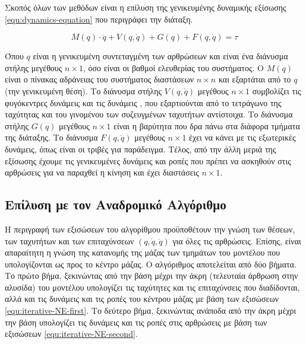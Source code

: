 Σκοπός όλων των μεθόδων είναι η επίλυση της γενικευμένης δυναμικής εξίσωσης \ref{equ:dynamics-equation} που περιγράφει την διάταξη.

\begin{equation}
    M(q) \cdot \ddot{q} + V(q, \dot{q}) + G(q) + F(q, \dot{q}) = \tau
    \label{equ:dynamics-equation}
\end{equation}

Όπου $q$ είναι η γενικευμένη συντεταγμένη των αρθρώσεων και είναι ένα διάνυσμα στήλης μεγέθους $n \times 1$, όσο είναι οι βαθμοί ελευθερίας του συστήματος. Ο $M(q)$ είναι ο πίνακας αδράνειας του συστήματος διαστάσεων $n \times n$ και εξαρτάται από το $q$ (την γενικευμένη θέση). Το διάνυσμα στήλης $V(q, \dot{q})$ μεγέθους $n \times 1$ συμβολίζει τις φυγόκεντρες δυνάμεις και τις δυνάμεις , που εξαρτιούνται από το τετράγωνο της ταχύτητας και του γινομένου των συζευγμένων ταχυτήτων αντίστοιχα. Το διάνυσμα στήλης $G(q)$ μεγέθους $n \times 1$ είναι η βαρύτητα που δρα πάνω στα διάφορα τμήματα της διάταξης. Το διάνυσμα $F(q, \dot{q})$ μεγέθους $n \times 1$ έχει να κάνει με τις εξωτερικές δυνάμεις, όπως είναι οι τριβές για παράδειγμα. Τέλος, από την άλλη μεριά της εξίσωσης έχουμε τις γενικευμένες δυνάμεις και ροπές που πρέπει να ασκηθούν στις αρθρώσεις για να παραχθεί η κίνηση και έχει διαστάσεις $n \times 1$.

\subsection{Επίλυση με τον Αναδρομικό Αλγόριθμο}

Η περιγραφή των εξισώσεων του αλγορίθμου  προϋποθέτουν την γνώση των θέσεων, των ταχυτήτων και των επιταχύνσεων $(q, \dot{q}, \ddot{q})$ για όλες τις αρθρώσεις. Επίσης, είναι απαραίτητη η γνώση της κατανομής της μάζας των τμημάτων του μοντέλου που υπολογίζονται ως προς το κέντρο μάζας. Ο αλγόριθμος αποτελείται από δύο βήματα. Το πρώτο βήμα, ξεκινώντας από την βάση μέχρι την άκρη (τελευταία άρθρωση στην αλυσίδα) του μοντέλου υπολογίζει τις ταχύτητες και τις επιταχύνσεις που διαδίδονται, αλλά και τις δυνάμεις και τις ροπές του κέντρου μάζας με βάση των εξισώσεων \ref{equ:iterative-NE-first}. Το δεύτερο βήμα, ξεκινώντας ανάποδα από την άκρη μέχρι την βάση υπολογίζει τις δυνάμεις και τις ροπές στις αρθρώσεις με βάση των εξισώσεων \ref{equ:iterative-NE-second}.

